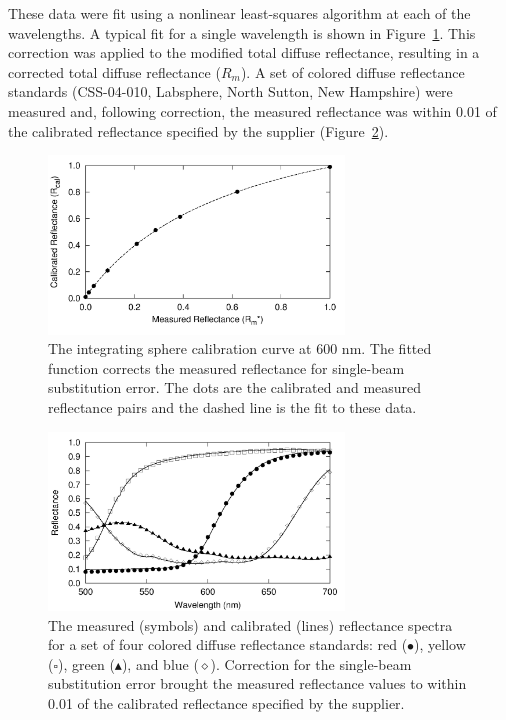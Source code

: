 These data were fit using a nonlinear least-squares algorithm at each of the wavelengths. A typical fit for a single wavelength is shown in Figure~\ref{fig:p1-sbse_cf}. This correction was applied to the modified total diffuse reflectance, resulting in a corrected total diffuse reflectance ($R_m$). A set of colored diffuse reflectance standards (CSS-04-010, Labsphere, North Sutton, New Hampshire) were measured and, following correction, the measured reflectance was within 0.01 of the calibrated reflectance specified by the supplier (Figure~\ref{fig:p1-colored_refl}).

\begin{figure}
	\centering \includegraphics[width=0.7\textwidth]{figures/p1-sbse_cf.png}
	\caption[Single-beam substitution error correction curve text]{\label{fig:p1-sbse_cf}The integrating sphere calibration curve at 600 nm. The fitted function corrects the measured reflectance for single-beam substitution error. The dots are the calibrated and measured reflectance pairs and the dashed line is the fit to these data.}
\end{figure}

\begin{figure}
	\centering \includegraphics[width=0.7\textwidth]{figures/p1-colored_refl.png}
	\caption[Measured and calibrated reflectance spectra]{\label{fig:p1-colored_refl}The measured (symbols) and calibrated (lines) reflectance spectra for a set of four colored diffuse reflectance standards: red ($\bullet$), yellow ($\square$), green ($\blacktriangle$), and blue ($\diamond$). Correction for the single-beam substitution error brought the measured reflectance values to within 0.01 of the calibrated reflectance specified by the supplier.}
\end{figure}

